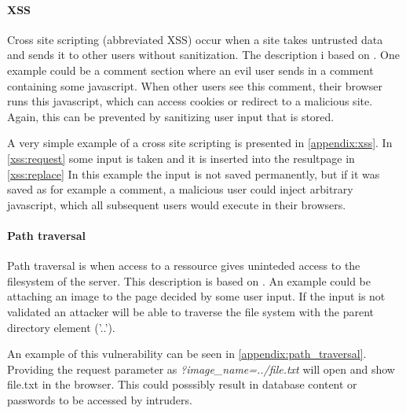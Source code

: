 \paragraph{XSS}
Cross site scripting (abbreviated XSS) occur when a site takes untrusted data and sends it to other users without sanitization.
The description i based on \citet{crosssitescripting}.
One example could be a comment section where an evil user sends in a comment containing some javascript.
When other users see this comment, their browser runs this javascript, which can access cookies or redirect to a malicious site.
Again, this can be prevented by sanitizing user input that is stored.

A very simple example of a cross site scripting is presented in \cref{appendix:xss}.
In \cref{xss:request} some input is taken and it is inserted into the resultpage in \cref{xss:replace}
In this example the input is not saved permanently, but if it was saved as for example a comment, a malicious user could inject arbitrary javascript, which all subsequent users would execute in their browsers.

\paragraph{Path traversal}
Path traversal is when access to a ressource gives uninteded access to the filesystem of the server.
This description is based on \citet{pathtraversal}.
An example could be attaching an image to the page decided by some user input.
If the input is not validated an attacker will be able to traverse the file system with the parent directory element ('..'). 

An example of this vulnerability can be seen in \cref{appendix:path_traversal}.
Providing the request parameter as \emph{?image\_name=../file.txt} will open and show file.txt in the browser.
This could posssibly result in database content or passwords to be accessed by intruders.


